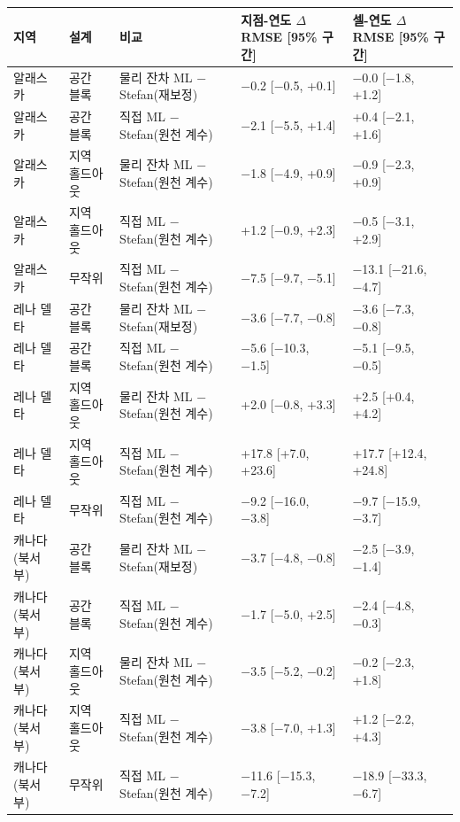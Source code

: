 \setlength{\tabcolsep}{3.5pt}\begin{tabular}{@{}lllll@{}}
\toprule
지역 & 설계 & 비교 & 지점-연도 $\Delta$RMSE [95\% 구간] & 셀-연도 $\Delta$RMSE [95\% 구간] \\
\midrule
알래스카 & 공간 블록 & 물리 잔차 ML − Stefan(재보정) & −0.2 [−0.5, +0.1] & −0.0 [−1.8, +1.2] \\
알래스카 & 공간 블록 & 직접 ML − Stefan(원천 계수) & −2.1 [−5.5, +1.4] & +0.4 [−2.1, +1.6] \\
알래스카 & 지역 홀드아웃 & 물리 잔차 ML − Stefan(원천 계수) & −1.8 [−4.9, +0.9] & −0.9 [−2.3, +0.9] \\
알래스카 & 지역 홀드아웃 & 직접 ML − Stefan(원천 계수) & +1.2 [−0.9, +2.3] & −0.5 [−3.1, +2.9] \\
알래스카 & 무작위 & 직접 ML − Stefan(원천 계수) & −7.5 [−9.7, −5.1] & −13.1 [−21.6, −4.7] \\
레나 델타 & 공간 블록 & 물리 잔차 ML − Stefan(재보정) & −3.6 [−7.7, −0.8] & −3.6 [−7.3, −0.8] \\
레나 델타 & 공간 블록 & 직접 ML − Stefan(원천 계수) & −5.6 [−10.3, −1.5] & −5.1 [−9.5, −0.5] \\
레나 델타 & 지역 홀드아웃 & 물리 잔차 ML − Stefan(원천 계수) & +2.0 [−0.8, +3.3] & +2.5 [+0.4, +4.2] \\
레나 델타 & 지역 홀드아웃 & 직접 ML − Stefan(원천 계수) & +17.8 [+7.0, +23.6] & +17.7 [+12.4, +24.8] \\
레나 델타 & 무작위 & 직접 ML − Stefan(원천 계수) & −9.2 [−16.0, −3.8] & −9.7 [−15.9, −3.7] \\
캐나다(북서부) & 공간 블록 & 물리 잔차 ML − Stefan(재보정) & −3.7 [−4.8, −0.8] & −2.5 [−3.9, −1.4] \\
캐나다(북서부) & 공간 블록 & 직접 ML − Stefan(원천 계수) & −1.7 [−5.0, +2.5] & −2.4 [−4.8, −0.3] \\
캐나다(북서부) & 지역 홀드아웃 & 물리 잔차 ML − Stefan(원천 계수) & −3.5 [−5.2, −0.2] & −0.2 [−2.3, +1.8] \\
캐나다(북서부) & 지역 홀드아웃 & 직접 ML − Stefan(원천 계수) & −3.8 [−7.0, +1.3] & +1.2 [−2.2, +4.3] \\
캐나다(북서부) & 무작위 & 직접 ML − Stefan(원천 계수) & −11.6 [−15.3, −7.2] & −18.9 [−33.3, −6.7] \\
\bottomrule
\end{tabular}
